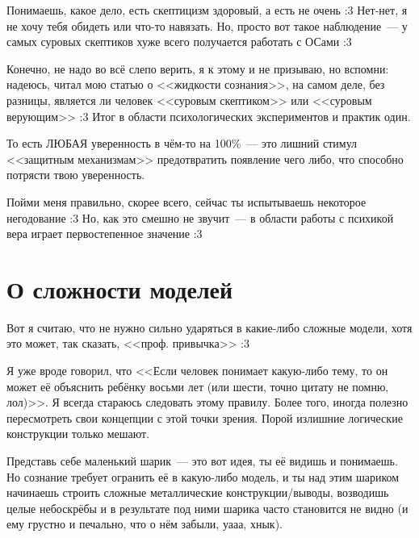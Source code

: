 \documentclass[a5paper,12pt,twoside]{memoir}
\begin{document}
\medskip

Понимаешь, какое дело, есть скептицизм здоровый, а есть не очень :3 Нет-нет, я не хочу тебя обидеть или что-то навязать. Но, просто вот такое наблюдение~--- у самых суровых скептиков хуже всего получается работать с ОСами :3 

Конечно, не надо во всё слепо верить, я к этому и не призываю, но вспомни: надеюсь, читал мою статью о <<жидкости сознания>>, на самом деле, без разницы, является ли человек <<суровым скептиком>> или <<суровым верующим>> :3 Итог в области психологических экспериментов и практик один. 

То есть ЛЮБАЯ уверенность в чём-то на 100\%~--- это лишний стимул <<защитным механизмам>> предотвратить появление чего либо, что способно потрясти твою уверенность. 

Пойми меня правильно, скорее всего, сейчас ты испытываешь некоторое негодование :3 Но, как это смешно не звучит~--- в области работы с психикой вера играет первостепенное значение :3 




\section{О сложности моделей}
Вот я считаю, что не нужно сильно ударяться в какие-либо сложные модели, хотя это может, так сказать, <<проф. привычка>> :3
 
Я уже вроде говорил, что <<Если человек понимает какую-либо тему, то он может её объяснить ребёнку восьми лет (или шести, точно цитату не помню,  лол)>>. Я всегда стараюсь следовать этому правилу. Более того, иногда полезно пересмотреть свои концепции с этой точки зрения. Порой излишние логические конструкции только мешают. 

Представь себе маленький шарик~--- это вот идея, ты её видишь и понимаешь. Но сознание требует огранить её в какую-либо модель, и ты над этим шариком начинаешь строить сложные металлические конструкции/выводы, возводишь целые небоскрёбы и в результате под ними шарика часто становится не видно (и ему грустно и печально, что о нём забыли, уааа, хнык). 
\end{document}
